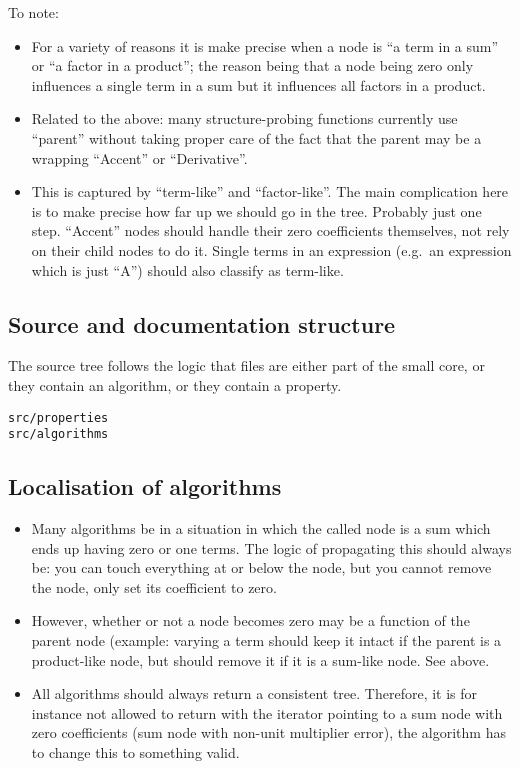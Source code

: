 \documentclass[11pt]{article}
\begin{document}
To note:
\begin{itemize}
\item For a variety of reasons it is make precise when a node is ``a
  term in a sum'' or ``a factor in a product''; the reason being that
  a node being zero only influences a single term in a sum but it
  influences all factors in a product. 

\item Related to the above: many structure-probing functions currently
  use ``parent'' without taking proper care of the fact that the
  parent may be a wrapping ``Accent'' or ``Derivative''. 

\item This is captured by ``term-like'' and ``factor-like''. The main
  complication here is to make precise how far up we should go in the
  tree. Probably just one step. ``Accent'' nodes should handle their
  zero coefficients themselves, not rely on their child nodes to do
  it. Single terms in an expression (e.g.~an expression which is just
  ``A'') should also classify as term-like.
\end{itemize}

\subsection{Source and documentation structure}

The source tree follows the logic that files are either part of the
small core, or they contain an algorithm, or they contain a property. 
\begin{verbatim}
src/properties
src/algorithms
\end{verbatim}

\subsection{Localisation of algorithms}

\begin{itemize}
\item Many algorithms be in a situation in which the called
  node is a sum which ends up having zero or one terms. The logic of
  propagating this should always be: you can touch everything at or
  below the node, but you cannot remove the node, only set its
  coefficient to zero. 

\item However, whether or not a node becomes zero may be a function of
  the parent node (example: varying a term should keep it intact if
  the parent is a product-like node, but should remove it if it is a
  sum-like node. See above.

\item All algorithms should always return a consistent
  tree. Therefore, it is for instance not allowed to return with the
  iterator pointing to a sum node with zero coefficients (sum node
  with non-unit multiplier error), the algorithm has to change this to
  something valid.

\end{itemize}
\end{document}
